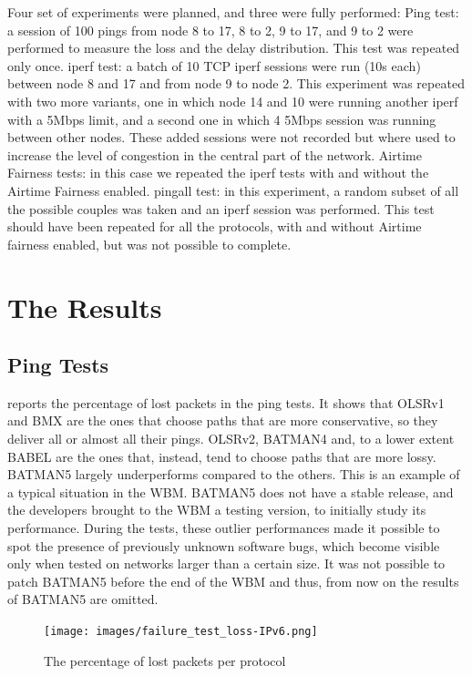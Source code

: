 \documentclass[10pt,onecolumn]{paper}
\begin{document}
Four set of experiments were planned, and three were fully performed:
\bi
\ii Ping test: a session of 100 pings from node 8 to 17, 8 to 2, 9 to 17, and 9
to 2 were performed to measure the loss and the delay distribution. This test
was repeated only once.
\ii iperf test: a batch of 10 TCP iperf sessions were run (10s each) between node 8
and 17 and from node 9 to node 2. This experiment was repeated with two more
variants, one in which node 14 and 10 were running another iperf with a 5Mbps
limit, and a second one in which 4 5Mbps session was running between other
nodes. These added sessions were not recorded but where used to increase
the level of congestion in the central part of the network.
\ii Airtime Fairness tests: in this case we repeated the iperf tests with and
without the Airtime Fairness enabled.
\ii pingall test: in this experiment, a random subset of all the possible
couples was taken and an iperf session was performed. This test should have been
repeated for all the protocols, with and without Airtime fairness enabled, but
was not possible to complete.
\ei

\section{The Results}

\subsection{Ping Tests}

 reports the percentage of lost packets in the ping tests. It
shows that OLSRv1 and BMX are the ones that choose paths that are more
conservative, so they deliver all or almost all their pings. OLSRv2, BATMAN4
and, to a lower extent BABEL are the ones that, instead, tend to choose paths
that are more lossy. BATMAN5 largely underperforms compared to the others. This
is an example of a typical situation in the WBM. BATMAN5 does not have a stable
release, and the developers brought to the WBM a testing version, to initially
study its performance. During the tests, these outlier performances made it
possible to spot the presence of previously unknown software bugs, which become
visible only when tested on networks larger than a certain size. 
It was not possible to patch BATMAN5 before the end of the WBM and thus, from
now on the results of BATMAN5 are omitted. 

\begin{figure}[!htb]
  \centering
  \texttt{[image: images/failure\_test\_loss-IPv6.png]}
  \caption{The percentage of lost packets per protocol}
    \label{fig:pingloss}
\end{figure}
\end{document}
